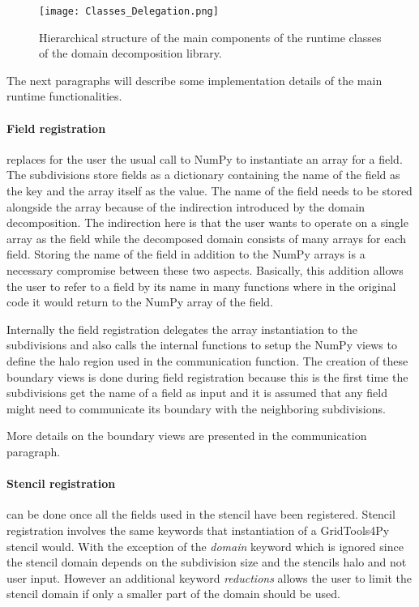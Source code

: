 \begin{figure}
\centering
\texttt{[image: Classes\_Delegation.png]}
\caption{Hierarchical structure of the main components of the runtime classes of the domain decomposition library.}
\label{fig:classes_chart}
\end{figure}

The next paragraphs will describe some implementation details of the main runtime functionalities.

\paragraph{Field registration } replaces for the user the usual call to NumPy to instantiate an array for a field.
The subdivisions store fields as a dictionary containing the name of the field as the key and the array itself as the value.
The name of the field needs to be stored alongside the array because of the indirection introduced by the domain decomposition.
The indirection here is that the user wants to operate on a single array as the field while the decomposed domain consists of many arrays for each field.
Storing the name of the field in addition to the NumPy arrays is a necessary compromise between these two aspects.
Basically, this addition allows the user to refer to a field by its name in many functions where in the original code it would return to the NumPy array of the field.

Internally the field registration delegates the array instantiation to the subdivisions and also calls the internal functions to setup the NumPy views to define the halo region used in the communication function.
The creation of these boundary views is done during field registration because this is the first time the subdivisions get the name of a field as input and it is assumed that any field might need to communicate its boundary with the neighboring subdivisions.

More details on the boundary views are presented in the communication paragraph.

\paragraph{Stencil registration } can be done once all the fields used in the stencil have been registered.
Stencil registration involves the same keywords that instantiation of a GridTools4Py stencil would.
With the exception of the \textit{domain} keyword which is ignored since the stencil domain depends on the subdivision size and the stencils halo and not user input.
However an additional keyword \textit{reductions} allows the user to limit the stencil domain if only a smaller part of the domain should be used.

